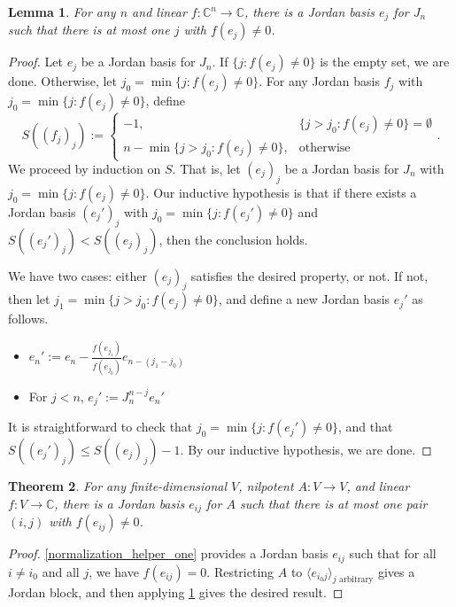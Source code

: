 \documentclass[12pt,psamsfonts]{article}
\newtheorem{theorem}{Theorem}[section]
\newtheorem{lemma}[theorem]{Lemma}
\begin{document}
\begin{lemma}\label{normalization_helper_two}
    For any \(n\) and linear \(f : \mathbb{C}^n \to \mathbb{C}\), there is a Jordan basis \(e_j\) for \(J_n\) such that there is at most one \(j\) with \(f(e_j) \neq 0\).
\end{lemma}
\begin{proof}
    Let \(e_j\) be a Jordan basis for \(J_n\).
    If \(\{j : f(e_j) \neq 0\}\) is the empty set, we are done.
    Otherwise, let \(j_0 = \min\{j : f(e_j) \neq 0\}\).
    For any Jordan basis \(f_j\) with \(j_0 = \min\{j : f(e_j) \neq 0\}\), define 
    \[S((f_j)_j) := \begin{cases}
        -1, & \{j > j_0 : f(e_j) \neq 0\} = \emptyset \\
        n - \min\{j > j_0 : f(e_j) \neq 0\}, & \textrm{otherwise}
    \end{cases}.\]
    We proceed by induction on \(S\).
    That is, let \((e_j)_j\) be a Jordan basis for \(J_n\) with \(j_0 = \min\{j : f(e_j) \neq 0\}\).
    Our inductive hypothesis is that if there exists a Jordan basis \((e_j')_j\) with \(j_0 = \min\{j : f(e_j') \neq 0\}\) and \(S((e_j')_j) < S((e_j)_j)\), then the conclusion holds.
    \par We have two cases: either \((e_j)_j\) satisfies the desired property, or not.
    If not, then let \(j_1 = \min\{j > j_0 : f(e_j) \neq 0\}\), and define a new Jordan basis \(e_j'\) as follows.
    \begin{itemize}
        \item \(e_n' := e_n - \frac{f(e_{j_1})}{f(e_{j_0})} e_{n - (j_1 - j_0)}\)
        \item For \(j < n\), \(e_j' := J_n^{n - j} e_n'\)
    \end{itemize}
    It is straightforward to check that \(j_0 = \min\{j : f(e_j') \neq 0\}\), and that \(S((e_j')_j) \leq S((e_j)_j) - 1\).
    By our inductive hypothesis, we are done.
\end{proof}

\begin{theorem}\label{normalization}
    For any finite-dimensional \(V\), nilpotent \(A : V \to V\), and linear \(f : V \to \mathbb{C}\), there is a Jordan basis \(e_{ij}\) for \(A\) such that there is at most one pair \((i, j)\) with \(f(e_{ij}) \neq 0\).
\end{theorem}
\begin{proof}
    \cref{normalization_helper_one} provides a Jordan basis \(e_{ij}\) such that for all \(i \neq i_0\) and all \(j\), we have \(f(e_{ij}) = 0\).
    Restricting \(A\) to \(\langle e_{i_0j}\rangle_{j \textrm{ arbitrary}}\) gives a Jordan block, and then applying \cref{normalization_helper_two} gives the desired result.
\end{proof}
\end{document}
